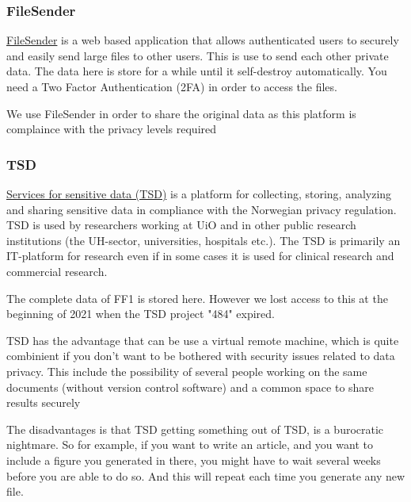 \subsubsection{FileSender}

\href{https://www.uio.no/english/services/it/research/storage/filesender.html}{FileSender} is a web based application that allows authenticated users to securely and easily send large files to other users. This is use to send each other private data. The data here is store for a while until it self-destroy automatically. You need a Two Factor Authentication (2FA) in order to access the files.\vspace{3 mm}

We use FileSender in order to share the original data as this platform is complaince with the privacy levels required\vspace{3 mm}

\subsubsection{TSD}

\href{https://www.uio.no/english/services/it/research/storage/filesender.html}{Services for sensitive data (TSD)} is a platform for collecting, storing, analyzing and sharing sensitive data in compliance with the Norwegian privacy regulation. TSD is used by researchers working at UiO and in other public research institutions (the UH-sector, universities, hospitals etc.). The TSD is primarily an IT-platform for research even if in some cases it is used for clinical research and commercial research.\vspace{3 mm}

The complete data of FF1 is stored here. However we lost access to this at the beginning of 2021 when the TSD project "484" expired.\vspace{3 mm}

TSD has the advantage that can be use a virtual remote machine, which is quite combinient if you don't want to be bothered with security issues related to data privacy. This include the possibility of several people working on the same documents (without version control software) and a common space to share results securely \vspace{3 mm}

The disadvantages is that TSD getting something out of TSD, is a burocratic nightmare. So for example, if you want to write an article, and you want to include a figure you generated in there, you might have to wait several weeks before you are able to do so. And this will repeat each time you generate any new file.\vspace{3 mm}

